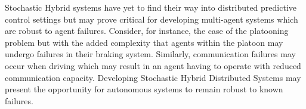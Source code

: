 \documentclass[../sample.tex]{subfiles}
\begin{document}
Stochastic Hybrid systems have yet to find their way into distributed predictive control settings
but may prove critical for developing multi-agent systems which are robust to agent failures.
Consider, for instance, the case of the platooning problem but with the added complexity that agents
within the platoon may undergo failures in their braking system. Similarly, communication failures
may occur when driving which may result in an agent having to operate with reduced communication
capacity. Developing Stochastic Hybrid Distributed Systems may present the opportunity for
autonomous systems to remain robust to known failures. 
\end{document}
